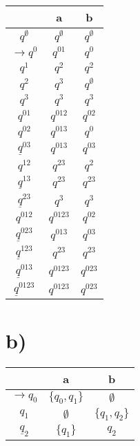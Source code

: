 \documentclass{article}
\begin{document}
\vspace{-2cm}
\begin{minipage}{.7\linewidth}
\centering
\begin{tabular}{ c | c | c }
  & a & b \\ 
\hline
$q^\emptyset$         & $q^\emptyset$   & $q^\emptyset$ \\  \hline
$\rightarrow q^0$     & $q^{01}$      & $q^0$ \\  \hline
$q^1$                 & $q^2$         & $q^2$ \\ \hline
$q^2$                 & $q^3$         & $q^\emptyset$ \\ \hline
$q^3$                 & $q^3$         & $q^3$ \\ \hline

$q^{01}$              & $q^{012}$     & $q^{02}$ \\ \hline
$q^{02}$              & $q^{013}$     & $q^0$ \\ \hline
$\underline q^{03}$   & $q^{013}$     & $q^{03}$ \\ \hline
$q^{12}$              & $q^{23}$      & $q^2$ \\ \hline
$\underline q^{13}$   & $q^{23}$      & $q^{23}$ \\ \hline
$\underline q^{23}$   & $q^3$         & $q^3$ \\ \hline

$q^{012}$             & $q^{0123}$    & $q^{02}$ \\ \hline
$\underline q^{023}$  & $q^{013}$     & $q^{03}$ \\ \hline
$\underline q^{123}$  & $q^{23}$      & $q^{23}$ \\ \hline
$\underline q^{013}$  & $q^{0123}$    & $q^{023}$ \\ \hline

$\underline q^{0123}$ & $q^{0123}$    & $q^{023}$ \\ 

\end{tabular}
\end{minipage}
\section*{b)}

\begin{minipage}{.2\linewidth}
\centering
\begin{tabular}{ c | c | c }
  & a & b \\ 
\hline
$\rightarrow q_0$   & $\{q_0 , q_1\}$ & $\emptyset$ \\  \hline
$q_1$               & $\emptyset$     & $\{q_1 , q_2\}$ \\ \hline
$\underline q_2$    & $\{q_1\}$       & $q_2$\\ 
\end{tabular}
\end{minipage}
\end{document}

